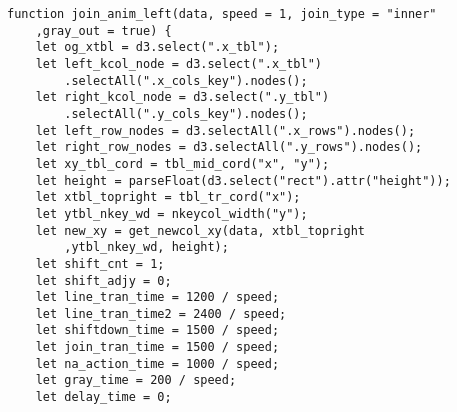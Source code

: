\begin{lstlisting}
function join_anim_left(data, speed = 1, join_type = "inner"
    ,gray_out = true) {
    let og_xtbl = d3.select(".x_tbl");
    let left_kcol_node = d3.select(".x_tbl")
        .selectAll(".x_cols_key").nodes();
    let right_kcol_node = d3.select(".y_tbl")
        .selectAll(".y_cols_key").nodes();
    let left_row_nodes = d3.selectAll(".x_rows").nodes();
    let right_row_nodes = d3.selectAll(".y_rows").nodes();
    let xy_tbl_cord = tbl_mid_cord("x", "y");
    let height = parseFloat(d3.select("rect").attr("height"));
    let xtbl_topright = tbl_tr_cord("x");
    let ytbl_nkey_wd = nkeycol_width("y");
    let new_xy = get_newcol_xy(data, xtbl_topright
        ,ytbl_nkey_wd, height);
    let shift_cnt = 1;
    let shift_adjy = 0;
    let line_tran_time = 1200 / speed;
    let line_tran_time2 = 2400 / speed;
    let shiftdown_time = 1500 / speed;
    let join_tran_time = 1500 / speed;
    let na_action_time = 1000 / speed;
    let gray_time = 200 / speed;
    let delay_time = 0;


\end{lstlisting}
